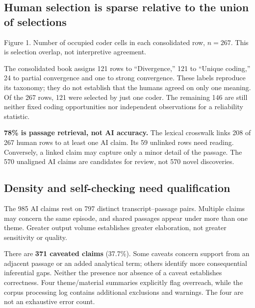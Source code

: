 \documentclass[10pt,a4paper]{article}
\begin{document}
\subsection*{Human selection is sparse relative to the union of selections}
{\footnotesize\color{muted}Figure 1. Number of occupied coder cells in each consolidated row, $n=267$. This is selection overlap, not interpretive agreement.}

The consolidated book assigns 121 rows to ``Divergence,'' 121 to ``Unique coding,'' 24 to partial convergence and one to strong convergence. These labels reproduce its taxonomy; they do not establish that the humans agreed on only one meaning. Of the 267 rows, 121 were selected by just one coder. The remaining 146 are still neither fixed coding opportunities nor independent observations for a reliability statistic.

\begin{caution}
\textbf{78\% is passage retrieval, not AI accuracy.} The lexical crosswalk links 208 of 267 human rows to at least one AI claim. Its 59 unlinked rows need reading. Conversely, a linked claim may capture only a minor detail of the passage. The 570 unaligned AI claims are candidates for review, not 570 novel discoveries.
\end{caution}
\subsection*{Density and self-checking need qualification}
The 985 AI claims rest on 797 distinct transcript--passage pairs. Multiple claims may concern the same episode, and shared passages appear under more than one theme. Greater output volume establishes greater elaboration, not greater sensitivity or quality.

There are \textbf{371 caveated claims} (37.7\%). Some caveats concern support from an adjacent passage or an added analytical term; others identify more consequential inferential gaps. Neither the presence nor absence of a caveat establishes correctness. Four theme/material summaries explicitly flag overreach, while the corpus processing log contains additional exclusions and warnings. The four are not an exhaustive error count.
\end{document}
